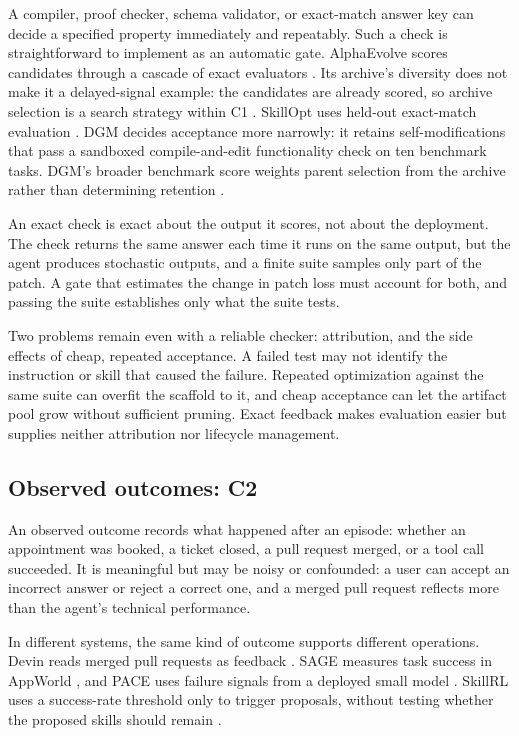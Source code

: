 A compiler, proof checker, schema validator, or exact-match answer key can decide a specified property immediately and repeatably. Such a check is straightforward to implement as an automatic gate. AlphaEvolve scores candidates through a cascade of exact evaluators \cite{alphaevolve2025}. Its archive's diversity does not make it a delayed-signal example: the candidates are already scored, so archive selection is a search strategy within C1 \cite{alphaevolve2025}. SkillOpt uses held-out exact-match evaluation \cite{yang2026skillopt}. DGM decides acceptance more narrowly: it retains self-modifications that pass a sandboxed compile-and-edit functionality check on ten benchmark tasks. DGM's broader benchmark score weights parent selection from the archive rather than determining retention \cite{zhang2025darwin}.

An exact check is exact about the output it scores, not about the deployment. The check returns the same answer each time it runs on the same output, but the agent produces stochastic outputs, and a finite suite samples only part of the patch. A gate that estimates the change in patch loss must account for both, and passing the suite establishes only what the suite tests.

Two problems remain even with a reliable checker: attribution, and the side effects of cheap, repeated acceptance. A failed test may not identify the instruction or skill that caused the failure. Repeated optimization against the same suite can overfit the scaffold to it, and cheap acceptance can let the artifact pool grow without sufficient pruning. Exact feedback makes evaluation easier but supplies neither attribution nor lifecycle management.

\subsection{Observed outcomes: C2}\label{observed-outcomes-c2}

An observed outcome records what happened after an episode: whether an appointment was booked, a ticket closed, a pull request merged, or a tool call succeeded. It is meaningful but may be noisy or confounded: a user can accept an incorrect answer or reject a correct one, and a merged pull request reflects more than the agent's technical performance.

In different systems, the same kind of outcome supports different operations. Devin reads merged pull requests as feedback \cite{cognition2025devinreview}. SAGE measures task success in AppWorld \cite{wang2025sage}, and PACE uses failure signals from a deployed small model \cite{ling2026pace}. SkillRL uses a success-rate threshold only to trigger proposals, without testing whether the proposed skills should remain \cite{skillrl2026}.

